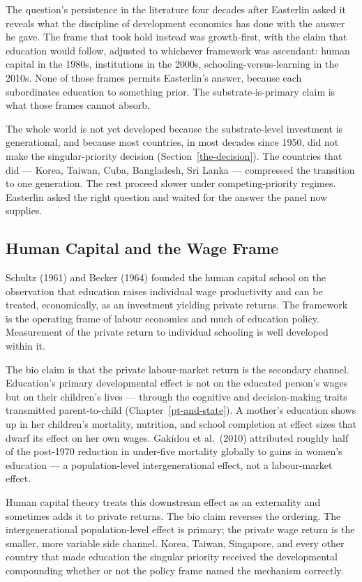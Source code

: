 \documentclass[12pt,letterpaper]{article}
\begin{document}
{The question's persistence in the literature four decades after Easterlin asked it reveals what the discipline of development economics has done with the answer he gave. The frame that took hold instead was growth-first, with the claim that education would follow, adjusted to whichever framework was ascendant: human capital in the 1980s, institutions in the 2000s, schooling-versus-learning in the 2010s. None of those frames permits Easterlin's answer, because each subordinates education to something prior. The substrate-is-primary claim is what those frames cannot absorb.

The whole world is not yet developed because the substrate-level investment is generational, and because most countries, in most decades since 1950, did not make the singular-priority decision (Section~\ref{the-decision}). The countries that did --- Korea, Taiwan, Cuba, Bangladesh, Sri Lanka --- compressed the transition to one generation. The rest proceed slower under competing-priority regimes. Easterlin asked the right question and waited for the answer the panel now supplies.

\subsection{Human Capital and the Wage Frame}\label{human-capital-and-the-wage-frame}

Schultz (1961) and Becker (1964) founded the human capital school on the observation that education raises individual wage productivity and can be treated, economically, as an investment yielding private returns. The framework is the operating frame of labour economics and much of education policy. Measurement of the private return to individual schooling is well developed within it.

The bio claim is that the private labour-market return is the secondary channel. Education's primary developmental effect is not on the educated person's wages but on their children's lives --- through the cognitive and decision-making traits transmitted parent-to-child (Chapter~\ref{pt-and-state}). A mother's education shows up in her children's mortality, nutrition, and school completion at effect sizes that dwarf its effect on her own wages. Gakidou et al.\ (2010) attributed roughly half of the post-1970 reduction in under-five mortality globally to gains in women's education --- a population-level intergenerational effect, not a labour-market effect.

Human capital theory treats this downstream effect as an externality and sometimes adds it to private returns. The bio claim reverses the ordering. The intergenerational population-level effect is primary; the private wage return is the smaller, more variable side channel. Korea, Taiwan, Singapore, and every other country that made education the singular priority received the developmental compounding whether or not the policy frame named the mechanism correctly.

}
\end{document}
